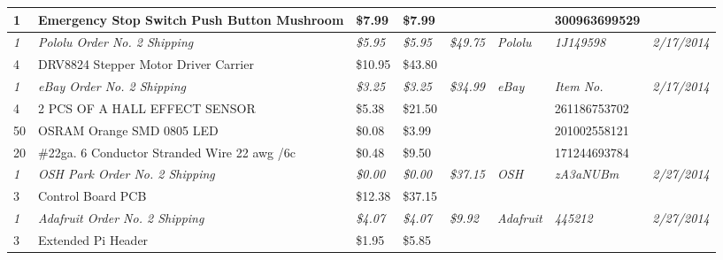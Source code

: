 \begin{table}[h]
{\begin{tabular}{llllllll}
1            & Emergency Stop Switch Push Button Mushroom        & \$7.99           & \$7.99           &                   &                   & 300963699529          &                     \\  \hline \hline
\textit{1}   & \textit{Pololu Order No. 2 Shipping}              & \textit{\$5.95}  & \textit{\$5.95}  & \textit{\$49.75}  & \textit{Pololu}   & \textit{1J149598}     & \textit{2/17/2014}  \\
4            & DRV8824 Stepper Motor Driver Carrier              & \$10.95          & \$43.80          &                   &                   &                       &                     \\  \hline \hline
\textit{1}   & \textit{eBay Order No. 2 Shipping}                & \textit{\$3.25}  & \textit{\$3.25}  & \textit{\$34.99}  & \textit{eBay}     & \textit{Item No.}     & \textit{2/17/2014}  \\
4            & 2 PCS OF A HALL EFFECT SENSOR                     & \$5.38           & \$21.50          &                   &                   & 261186753702          &                     \\
50           & OSRAM Orange SMD 0805 LED                         & \$0.08           & \$3.99           &                   &                   & 201002558121          &                     \\
20           & \#22ga. 6 Conductor Stranded Wire 22 awg /6c      & \$0.48           & \$9.50           &                   &                   & 171244693784          &                     \\  \hline \hline
\textit{1}   & \textit{OSH Park Order No. 2 Shipping}            & \textit{\$0.00}  & \textit{\$0.00}  & \textit{\$37.15}  & \textit{OSH}      & \textit{zA3aNUBm}     & \textit{2/27/2014}  \\
3            & Control Board PCB                                 & \$12.38          & \$37.15          &                   &                   &                       &                     \\  \hline \hline
\textit{1}   & \textit{Adafruit Order No. 2 Shipping}            & \textit{\$4.07}  & \textit{\$4.07}  & \textit{\$9.92}   & \textit{Adafruit} & \textit{445212}       & \textit{2/27/2014}  \\
3            & Extended Pi Header                                & \$1.95           & \$5.85           &                   &                   &                       &                     \\  \hline \hline

\end{tabular}}
\end{table}

